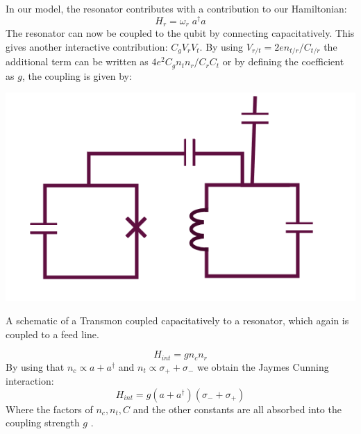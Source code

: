 In our model, the resonator contributes with a contribution to our Hamiltonian:
\begin{equation}
    H_r = \omega_r \; a^\dagger a
\end{equation}
The resonator can now be coupled to the qubit by connecting capacitatively. This gives another interactive contribution: $C_g V_r V_t$. By using $V_{r/t} = 2e n_{t/r} / C_{t/r}$ the additional term can be written as $4e^2C_g  n_t n_r / C_r C_t$ or by defining the coefficient as $g$, the coupling is given by:
\begin{marginfigure}
    \centering
    \includegraphics{Figs/Sections/computations_and_readout/qubit_resonator_feedline.png}
    \caption{A schematic of a Transmon coupled capacitatively to a resonator, which again is coupled to a feed line.}
    \label{fig:schematic_qubit_res}
\end{marginfigure}
\begin{equation}
    H_{int} = g n_c n_r 
\end{equation}
By using that $n_c \propto a + a^\dagger$ and $n_t \propto \sigma_+ + \sigma_-$ we obtain the Jaymes Cunning interaction:
\begin{equation}
    H_{int} = g (a + a^\dagger) (\sigma_- + \sigma_+)
\end{equation}
Where the factors of $n_c, n_t, C$ and the other constants are all absorbed into the coupling strength $g$ \cite{krantz_quantum_2019}. 


